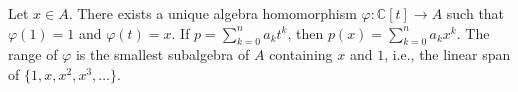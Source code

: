 Let $x \in A$. There exists a unique algebra homomorphism $\varphi: \mathbb{C}[t] \to A$ such that $\varphi(1) = 1$ and $\varphi(t) = x$. If $p = \sum_{k=0}^{n} a_k t^k$, then $p(x) = \sum_{k=0}^{n} a_k x^k$. The range of $\varphi$ is the smallest subalgebra of $A$ containing $x$ and $1$, i.e., the linear span of $\{1, x, x^2, x^3, \ldots\}$.
